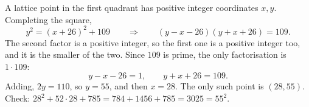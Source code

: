 A lattice point in the first quadrant has positive integer coordinates $x,y$. Completing the square,
\[y^2=(x+26)^2+109\qquad\Longrightarrow\qquad(y-x-26)(y+x+26)=109.\]
The second factor is a positive integer, so the first one is a positive integer too, and it is the smaller of the two. Since $109$ is prime, the only factorisation is $1\cdot109$:
\[y-x-26=1,\qquad y+x+26=109.\]
Adding, $2y=110$, so $y=55$, and then $x=28$. The only such point is $\boxed{(28,55)}$. Check: $28^2+52\cdot28+785=784+1456+785=3025=55^2$.
